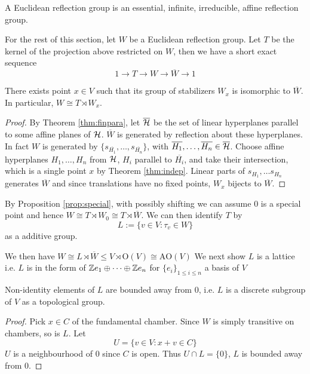 \documentclass[../main.tex]{subfiles}
\begin{document}
\begin{definition}
    A Euclidean reflection group is an essential, infinite, irreducible, affine reflection group.
\end{definition}

For the rest of this section, let $W$ be a Euclidean reflection group. Let $T$ be the kernel of the projection above restricted on $W$, then we have a short exact sequence \[
1\rightarrow T\rightarrow W \rightarrow\overline W \rightarrow 1
\]

\begin{proposition}\label{prop:special}
    There exists point $x\in V$ such that its group of stabilizers $W_x$ is isomorphic to $\overline W$. In particular, $W\cong T\rtimes W_x$.
\end{proposition}

\begin{proof}
    By Theorem \ref{thm:finpara}, let $\overline {\mathcal{H}}$ be the set of linear hyperplanes parallel to some affine planes of $\mathcal{H}$. $\overline W$ is generated by reflection about these hyperplanes. In fact $W$ is generated by $\{s_{\overline{H_1}},\dots,s_{\overline{H_n}}\}$, with $\overline{H_1},\dots,\overline{H_n} \in \overline {\mathcal{H}}$. Choose affine hyperplanes $H_1,\dots,H_n$ from $\mathcal{H}$, $H_i$ parallel to $\overline{H_i}$, and take their intersection, which is a single point $x$ by Theorem \ref{thm:indep}. Linear parts of $s_{H_1},\dots s_{H_n}$ generates $\overline W$ and since translations have no fixed points, $W_x$ bijects to $\overline W$.
\end{proof}

By Proposition \ref{prop:special}, with possibly shifting we can assume $0$ is a special point and hence $W\cong T\rtimes W_0\cong T \rtimes \overline W$. We can then identify $T$ by \[
L := \{v \in V : \tau_v \in W\}
\]
as a additive group. 

We then have $W\cong L\rtimes \overline W\leq V \rtimes \text{O}(V)\cong \text{AO}(V)$
We next show $L$ is a lattice i.e.   $L$ is in the form of $\mathbb{Z} e_1\oplus \dots \oplus \mathbb{Z} e_n$ for $\{e_i\}_{1\leq i\leq n}$ a basis of $V$


\begin{lemma}
    Non-identity elements of $L$ are bounded away from $0$, i.e. $L$ is a discrete subgroup of $V$ as a topological group. 
\end{lemma}

\begin{proof}
    Pick $x\in C$ of the fundamental chamber. Since $W$ is simply transitive on chambers, so is $L$. Let \[U=\{v\in V:x+v \in C\}\]
    $U$ is a neighbourhood of $0$ since $C$ is open. Thus $U\cap L=\{0\}$, $L$ is bounded away from $0$.
\end{proof}
\end{document}
